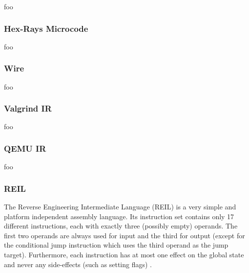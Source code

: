 \documentclass[12pt, a4paper]{article}
\begin{document}
foo


\subsubsection{Hex-Rays Microcode}

foo

\cite{hexrays}


\subsubsection{Wire}


foo



\subsubsection{Valgrind IR}

foo


\subsubsection{QEMU IR}

foo


\subsubsection{REIL}

The Reverse Engineering Intermediate Language (REIL) is a very simple and platform independent assembly language. Its instruction set contains only 17 different instructions, each with exactly three (possibly empty) operands. The first two operands are always used for input and the third for output (except for the conditional jump instruction which uses the third operand as the jump target). Furthermore, each instruction has at most one effect on the global state and never any side-effects (such as setting flags) \cite{reil,reil_spec}.
\end{document}
